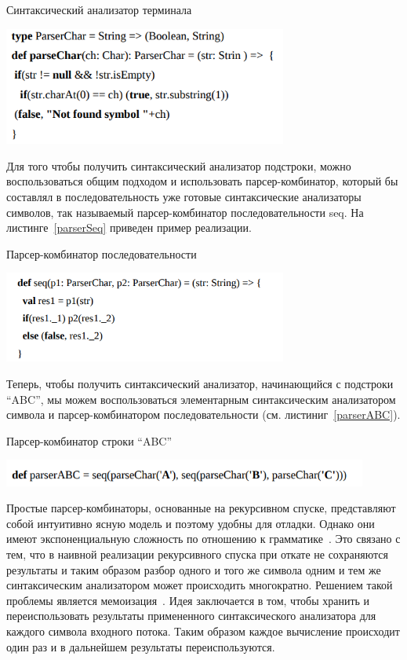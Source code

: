 \begin{listing}
\caption{Синтаксический анализатор терминала}
\label{parser1}
\centering
\includegraphics[width=0.7\textwidth]{Smolina/pics/parser1.png}
\end{listing}

Для того чтобы получить синтаксический анализатор подстроки, можно воспользоваться общим подходом и использовать парсер-комбинатор,
который бы составлял в последовательность уже готовые синтаксические анализаторы символов, так называемый парсер-комбинатор последовательности seq. На листинге~\ref{parserSeq} приведен пример реализации.

\begin{listing}
\caption{Парсер-комбинатор последовательности}
\label{parserSeq}
\centering
\includegraphics[width=0.7\textwidth]{Smolina/pics/parserSeq.png}
\end{listing}

Теперь, чтобы получить синтаксический анализатор, начинающийся с подстроки “ABC”, мы можем воспользоваться элементарным синтаксическим анализатором символа и парсер-комбинатором последовательности (см. листиниг~\ref{parserABC}).

\begin{listing}
\caption{Парсер-комбинатор строки “ABC”}
\label{parserABC}
\centering
\includegraphics[width=0.9\textwidth]{Smolina/pics/parserABC.png}
\end{listing}

Простые парсер-комбинаторы, основанные на рекурсивном спуске, представляют собой интуитивно ясную модель и поэтому удобны для
отладки. Однако они имеют экспоненциальную сложность по отношению к грамматике~\cite{Popov}. Это связано с тем, что в наивной реализации рекурсивного спуска при откате не сохраняются результаты и таким образом разбор одного и того же символа одним и тем же синтаксическим анализатором может происходить многократно. Решением такой проблемы является мемоизация~\cite{Memoization}. Идея заключается в том, чтобы хранить и переиспользовать результаты примененного синтаксического анализатора для каждого символа входного потока. Таким образом каждое вычисление происходит один раз и в дальнейшем результаты переиспользуются.

